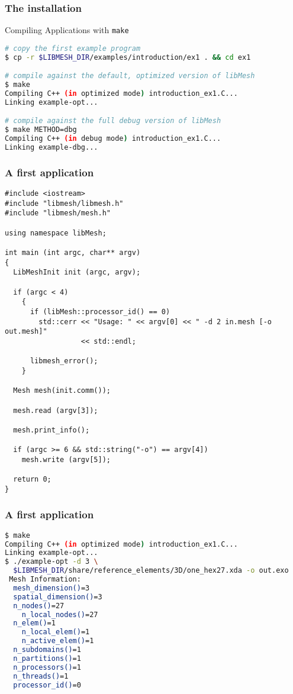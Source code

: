 \begin{frame}
  \frametitle{The \libMesh{} installation}

  \begin{block}{Compiling Applications with \texttt{make}}
    \begin{lstlisting}[language=bash]
# copy the first example program
$ cp -r $LIBMESH_DIR/examples/introduction/ex1 . && cd ex1

# compile against the default, optimized version of libMesh
$ make
Compiling C++ (in optimized mode) introduction_ex1.C...
Linking example-opt...

# compile against the full debug version of libMesh
$ make METHOD=dbg
Compiling C++ (in debug mode) introduction_ex1.C...
Linking example-dbg...
    \end{lstlisting}
  \end{block}
\end{frame}



\begin{frame}
  \frametitle{A first \libMesh{} application}
  \begin{lstlisting}
#include <iostream>
#include "libmesh/libmesh.h"
#include "libmesh/mesh.h"

using namespace libMesh;

int main (int argc, char** argv)
{
  LibMeshInit init (argc, argv);

  if (argc < 4)
    {
      if (libMesh::processor_id() == 0)
        std::cerr << "Usage: " << argv[0] << " -d 2 in.mesh [-o out.mesh]"
                  << std::endl;

      libmesh_error();
    }

  Mesh mesh(init.comm());

  mesh.read (argv[3]);

  mesh.print_info();

  if (argc >= 6 && std::string("-o") == argv[4])
    mesh.write (argv[5]);

  return 0;
}
  \end{lstlisting}
\end{frame}



\begin{frame}
  \frametitle{A first \libMesh{} application}
  \begin{lstlisting}[language=bash]
$ make
Compiling C++ (in optimized mode) introduction_ex1.C...
Linking example-opt...
$ ./example-opt -d 3 \
  $LIBMESH_DIR/share/reference_elements/3D/one_hex27.xda -o out.exo
 Mesh Information:
  mesh_dimension()=3
  spatial_dimension()=3
  n_nodes()=27
    n_local_nodes()=27
  n_elem()=1
    n_local_elem()=1
    n_active_elem()=1
  n_subdomains()=1
  n_partitions()=1
  n_processors()=1
  n_threads()=1
  processor_id()=0
  \end{lstlisting}
\end{frame}
